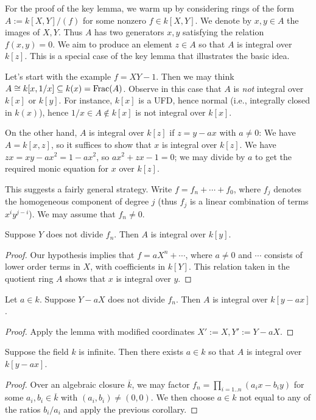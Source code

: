\documentclass[10pt]{article}
\begin{document}
For the proof of the key lemma,
we warm up by considering rings of the form
\(A := k[X,Y]/(f)\)
for some nonzero \(f \in k[X,Y]\).
We denote by \(x,y \in A\) the images of \(X,Y\).
Thus \(A\) has two generators \(x,y\)
satisfying the relation \(f(x,y) = 0\).
We aim to produce an element \(z \in A\) so that
\(A\) is integral over \(k[z]\).
This is a special case of the key lemma that illustrates
the basic idea.

Let's start with the example \(f = X Y - 1\).
Then we may think
\(A \cong k[x,1/x] \subseteq k(x) = \operatorname{Frac}(A)\).
Observe in this case that \(A\) is \emph{not} integral over \(k[x]\)
or \(k[y]\).
For instance, \(k[x]\) is a UFD,
hence normal
(i.e., integrally closed in \(k(x)\)),
hence \(1/x \in A \notin k[x]\) is not integral over \(k[x]\).

On the other hand,
\(A\) is integral over \(k[z]\)
if \(z = y - a x\) with \(a \neq 0\):
We have \(A = k[x,z]\),
so it suffices
to show that \(x\) is integral over \(k[z]\).
We have \(z x = x y - a x^2 = 1 - a x^2\),
so \(a x^2 + z x - 1 = 0\);
we may
divide by \(a\) to get the required monic equation
for \(x\) over \(k[z]\).

This suggests a fairly general strategy.  Write
\(f = f_n + \dotsb + f_0\), where \(f_j\) denotes the homogeneous
component of degree \(j\) (thus \(f_j\) is a linear combination of
terms \(x^i y^{j-i}\)).
We may assume that \(f_n \neq 0\).

\begin{lemma}
  Suppose $Y$ does not divide $f_n$.  Then $A$ is integral over
  $k[y]$.
\end{lemma}
\begin{proof}
  Our hypothesis implies that $f = a X^n + \dotsb$, where
  $a \neq 0$ and $\dotsb$ consists of lower order terms in $X$,
  with coefficients in $k[Y]$.  This relation taken in the
  quotient ring $A$ shows that $x$ is integral over $y$.
\end{proof}
\begin{corollary}
  Let $a \in k$.  Suppose $Y - a X$ does not divide $f_n$.  Then
  $A$ is integral over $k[y - a x]$.
\end{corollary}
\begin{proof}
  Apply the lemma with modified coordinates
  $X' := X, Y ' := Y - a X$.
\end{proof}
\begin{corollary}
  Suppose the field $k$ is infinite.  Then there exists
  $a \in k$ so that $A$ is integral over $k[y-ax]$.
\end{corollary}
\begin{proof}
  Over an algebraic closure $\overline{k}$, we may factor
  $f_n = \prod_{i=1..n} (a_i x - b_i y)$ for some
  $a_i,b_i \in \overline{k}$ with $(a_i,b_i) \neq (0,0)$.  We
  then choose $a \in k$ not equal to any of the ratios $b_i/a_i$
  and apply the previous corollary.
\end{proof}
\end{document}
